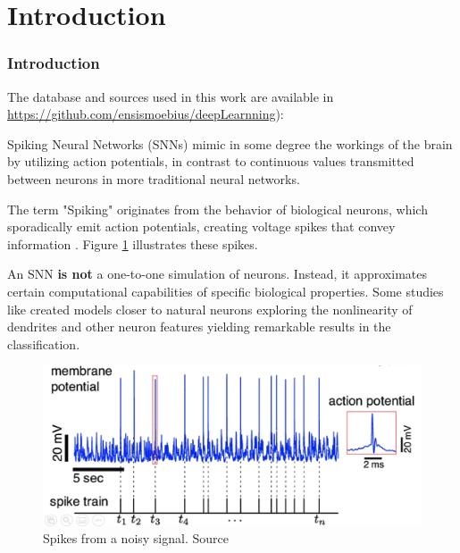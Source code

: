 \section{Introduction}
\begin{frame}[allowframebreaks]
	\frametitle{Introduction}
	
	\par The database and sources used in this work are available in \url{https://github.com/ensismoebius/deepLearnning}):\newline
	
	\par Spiking Neural Networks (SNNs) mimic in some degree the workings of the brain by utilizing action potentials, in contrast to continuous values transmitted between neurons in more traditional neural networks.\newline
	
	\par The term "Spiking" originates from the behavior of biological neurons, which sporadically emit action potentials, creating voltage spikes that convey information \cite{kasabov2019time}. Figure \ref{fig:neuronspikes} illustrates these spikes.\newline
	
	\par An SNN \textbf{is not} a one-to-one simulation of neurons. Instead, it approximates certain computational capabilities of specific biological properties. Some studies like \cite{jones2020single} created models closer to natural neurons exploring the nonlinearity of dendrites and other neuron features yielding remarkable results in the classification.
	
	\begin{figure}[H]
		\centering
		\includegraphics[width=.8\linewidth]{images/neuronSpikes}
		\caption{Spikes from a noisy signal. Source \cite{dan_goodman_2022_7044500}}
		\label{fig:neuronspikes}
	\end{figure}
\end{frame}

